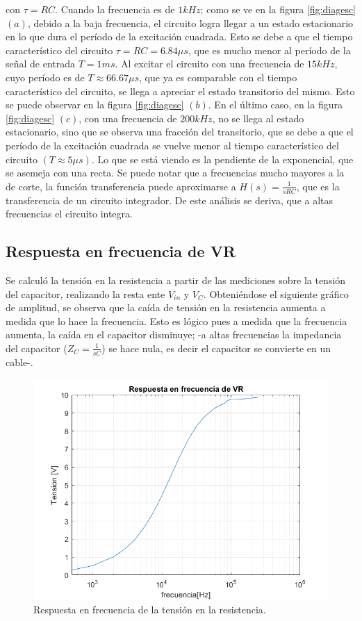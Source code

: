 con $\tau=RC$.
Cuando la frecuencia es de $1kHz$; como se ve en la figura \ref{fig:diagesc} $(a)$, debido a la baja frecuencia, el circuito logra llegar a un estado estacionario en lo que dura el período de la excitación cuadrada. Esto se debe a que el tiempo característico del circuito $\tau=RC=6.84\mu s$, que es mucho menor al período de la señal de entrada $T=1ms$.
Al excitar el circuito con una frecuencia de $15kHz$, cuyo período es de $ T\approx 66.67\mu s$, que ya es comparable con el tiempo característico del circuito, se llega a apreciar el estado transitorio del mismo. Esto se puede observar en la figura \ref{fig:diagesc} $(b)$.
En el último caso, en la figura \ref{fig:diagesc} $(c)$, con una frecuencia de $200kHz$, no se llega al estado estacionario, sino que se observa una fracción del transitorio, que se debe a que el período de la excitación cuadrada se vuelve menor al tiempo característico del circuito $(T\approx 5\mu s)$. Lo que se está viendo es la pendiente de la exponencial, que se asemeja con una recta.
Se puede notar que a frecuencias mucho mayores a la de corte, la función transferencia puede aproximarse a $H(s)=\frac{1}{sRC}$, que es la transferencia de un circuito integrador. De este análisis se deriva, que a altas frecuencias el circuito integra.

\subsection{Respuesta en frecuencia de VR}

Se calculó la tensión en la resistencia a partir de las mediciones sobre la tensión del capacitor, realizando la resta ente $V_{in}$ y $V_C$. Obteniéndose el siguiente gráfico de amplitud, se observa que la caída de tensión en la resistencia aumenta a medida que lo hace la frecuencia. Esto es lógico pues a medida que la frecuencia aumenta, la caída en el capacitor disminuye; -a altas frecuencias la impedancia del capacitor ($Z_C=\frac{1}{sC}$) se hace nula, es decir el capacitor se convierte en un cable-.

\begin{figure}[H]
\centering
\includegraphics[scale=0.5]{1-7.png} 
\caption{Respuesta en frecuencia de la tensión en la resistencia.}
\label{fig:rtafrecVR}
\end{figure}


